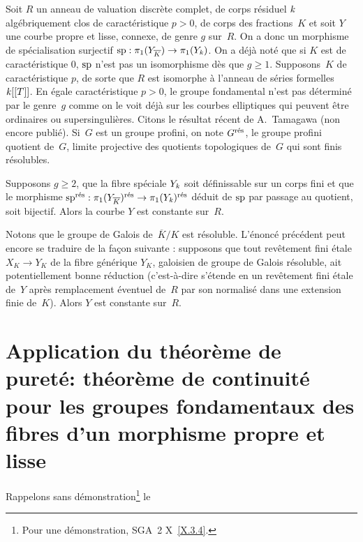 \begin{remarqueMR}
\label{X.2.14}
Soit $R$ un anneau de valuation discr\`ete complet, de
corps r\'esiduel $\kres$ alg\'ebriquement clos de caract\'eristique $p>0$, de
corps des fractions~$K$ et soit $Y$ une courbe propre et lisse,
connexe, de genre $g$ sur~$R$. On a donc un morphisme de
sp\'ecialisation surjectif $\sp : \pi_1(Y_{\overline{K}}) 
\to\pi_1(Y_{\kres})$.
On a d\'ej\`a not\'e que si $K$ est de caract\'eristique 0, $\sp$ n'est pas un
isomorphisme d\`es que $g\geq1$. Supposons~$K$ de caract\'eristique $p$,
de sorte que $R$ est isomorphe \`a l'anneau de s\'eries 
formelles~$\kres[[T]]$.
En \'egale caract\'eristique $p >0$, le groupe fondamental n'est pas
d\'etermin\'e par le genre~$g$ comme on le voit d\'ej\`a sur les courbes
elliptiques qui peuvent \^etre ordinaires ou supersinguli\`eres. Citons
le r\'esultat r\'ecent de A.\, Tamagawa (non encore publi\'e). Si~$G$ est un
groupe profini, on note $G^{\res}$, le groupe profini quotient de~$G$,
limite projective des quotients topologiques de~$G$ qui sont finis
r\'esolubles.

\begin{theoreme*}[A.\, Tamagawa]
Supposons $g\geq2$, que la fibre sp\'eciale $Y_{\kres}$
soit d\'efinissable sur un corps fini et que le morphisme
$\sp^{\res}:\pi_1(Y_{\overline{K}})^{\res}\to\pi_1(Y_{\kres})^{\res}$ d\'eduit de
$\sp$ par passage au quotient, soit bijectif. Alors la courbe $Y$ est
constante sur~$R$.
\end{theoreme*}

Notons que le groupe de Galois de~$\overline{K}/K$ est r\'esoluble. L'\'enonc\'e
pr\'ec\'edent peut encore se traduire de la fa\c{c}on suivante : supposons que
tout rev\^etement fini \'etale $X_K\to Y_K$ de la fibre g\'en\'erique $Y_K$,
galoisien de groupe de Galois r\'esoluble, ait potentiellement bonne
r\'eduction (c'est-\`a-dire s'\'etende en un rev\^etement fini \'etale de~$Y$
apr\`es remplacement \'eventuel de~$R$ par son normalis\'e dans une extension
finie de~$K$). Alors $Y$ est constante sur~$R$.
\end{remarqueMR}

\section[Application du th\'eor\`eme de puret\'e]{Application du th\'eor\`eme de puret\'e:
th\'eor\`eme de continuit\'e pour les groupes fondamentaux des
fibres d'un morphisme propre et lisse}
\label{X.3}

Rappelons sans d\'emonstration\footnote{Pour une d\'emonstration, \cf SGA~2 X~\ref{X.3.4}.} le

